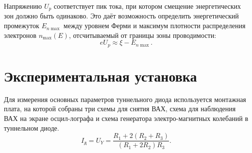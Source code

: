 \documentclass[a4paper,12pt]{article} %
\begin{document}
	Напряжению $U_p$ соответствует пик тока, при котором смещение энергетических зон должно быть одинаково. Это даёт возможность определить энергетический промежуток $E_{n \max}$ между уровнем Ферми и максимум плотности распределения электронов $n_{\max}(E)$, отсчитываемый от границы зоны проводимости:
	\begin{equation*}
		eU_p \approx \xi - E_{n\max}.
	\end{equation*}



	\section{Экспериментальная установка}
	Для измерения основных параметров туннельного диода используется монтажная плата, на которой собраны три схемы для снятия ВАХ, схема для наблюдения ВАХ на экране осцил-лографа и схема генератора электро-магнитных колебаний в туннельном диоде.
	\begin{equation*}
		I_\text{д} = U_Y = \frac{R_1 + 2(R_2 + R_3)}{(R_1 + 2R_2)R_3}.
	\end{equation*}
	
	
	\newpage
\end{document}
